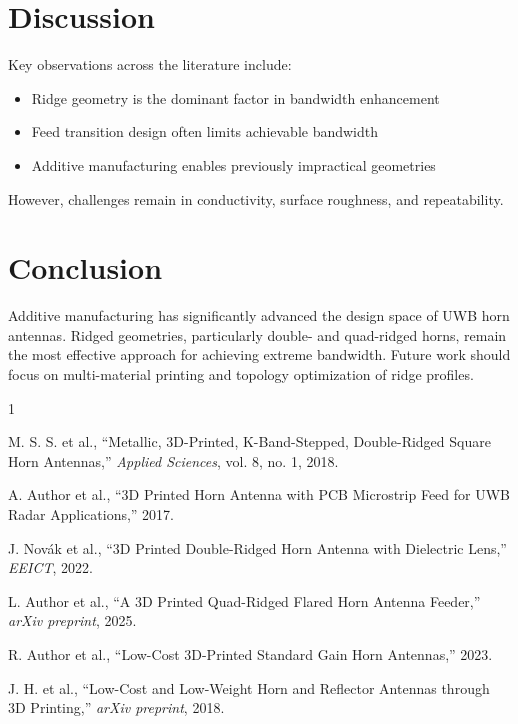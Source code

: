 \documentclass[conference]{IEEEtran}
\begin{document}
\section{Discussion}
Key observations across the literature include:
\begin{itemize}
    \item Ridge geometry is the dominant factor in bandwidth enhancement
    \item Feed transition design often limits achievable bandwidth
    \item Additive manufacturing enables previously impractical geometries
\end{itemize}

However, challenges remain in conductivity, surface roughness, and repeatability.

\section{Conclusion}
Additive manufacturing has significantly advanced the design space of UWB horn antennas. Ridged geometries, particularly double- and quad-ridged horns, remain the most effective approach for achieving extreme bandwidth. Future work should focus on multi-material printing and topology optimization of ridge profiles.

\begin{thebibliography}{1}

M. S. S. et al., ``Metallic, 3D-Printed, K-Band-Stepped, Double-Ridged Square Horn Antennas,'' \emph{Applied Sciences}, vol. 8, no. 1, 2018.

A. Author et al., ``3D Printed Horn Antenna with PCB Microstrip Feed for UWB Radar Applications,'' 2017.

J. Novák et al., ``3D Printed Double-Ridged Horn Antenna with Dielectric Lens,'' \emph{EEICT}, 2022.

L. Author et al., ``A 3D Printed Quad-Ridged Flared Horn Antenna Feeder,'' \emph{arXiv preprint}, 2025.

R. Author et al., ``Low-Cost 3D-Printed Standard Gain Horn Antennas,'' 2023.

J. H. et al., ``Low-Cost and Low-Weight Horn and Reflector Antennas through 3D Printing,'' \emph{arXiv preprint}, 2018.

\end{thebibliography}
\end{document}
